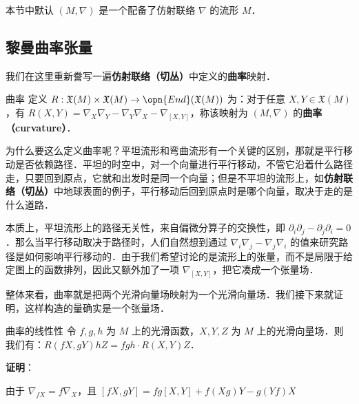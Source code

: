 

本节中默认 $(M, \nabla)$ 是一个配备了仿射联络 $\nabla$ 的流形 $M$．

\subsection{黎曼曲率张量}

我们在这里重新誊写一遍\textbf{仿射联络（切丛）}中定义的\textbf{曲率}映射．

\begin{definition}{曲率}
定义 $R:\mathfrak{X}(M)\times\mathfrak{X}(M)\to\opn{End}(\mathfrak{X}(M))$ 为：对于任意 $X, Y\in\mathfrak{X}(M)$，有 $R(X, Y)=\nabla_X\nabla_Y-\nabla_Y\nabla_X-\nabla_{[X, Y]}$，称该映射为 $(M, \nabla)$ 的\textbf{曲率（curvature）}．
\end{definition}

为什么要这么定义曲率呢？平坦流形和弯曲流形有一个关键的区别，那就是平行移动是否依赖路径．平坦的时空中，对一个向量进行平行移动，不管它沿着什么路径走，只要回到原点，它就和出发时是同一个向量；但是不平坦的流形上，如\textbf{仿射联络（切丛）}中地球表面的例子，平行移动后回到原点时是哪个向量，取决于走的是什么道路．

本质上，平坦流形上的路径无关性，来自偏微分算子的交换性，即 $\partial_i\partial_j-\partial_j\partial_i=0$．那么当平行移动取决于路径时，人们自然想到通过 $\nabla_i\nabla_j-\nabla_j\nabla_i$ 的值来研究路径是如何影响平行移动的．由于我们希望讨论的是流形上的张量，而不是局限于给定图上的函数排列，因此又额外加了一项 $\nabla_{[X, Y]}$，把它凑成一个张量场．

整体来看，曲率就是把两个光滑向量场映射为一个光滑向量场．我们接下来就证明，这样构造的量确实是一个张量场．

\begin{theorem}{曲率的线性性}\label{RicciC_the1}
令 $f, g, h$ 为 $M$ 上的光滑函数，$X, Y, Z$ 为 $M$ 上的光滑向量场．则我们有：$R(fX, gY)hZ=fgh\cdot R(X, Y)Z$．
\end{theorem}

\textbf{证明}：

由于 $\nabla_{fX}=f\nabla_X$，且 $[fX, gY]=fg[X, Y]+f(Xg)Y-g(Yf)X$

